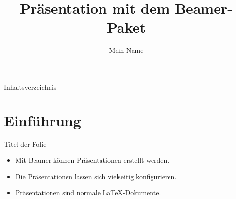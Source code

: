 \documentclass{beamer}
\title{Präsentation mit dem Beamer-Paket}
\author{Mein Name}
\begin{document}
\maketitle

\begin{frame}{Inhaltsverzeichnis}
  \tableofcontents
\end{frame}

\section{Einführung}

\begin{frame}{Titel der Folie}
  \begin{itemize}
    \item<1-> Mit Beamer können Präsentationen erstellt werden.
    \item<2-> Die Präsentationen lassen sich vielseitig konfigurieren.
    \item<3-> Präsentationen sind normale \LaTeX-Dokumente.
  \end{itemize}
\end{frame}
\end{document}
